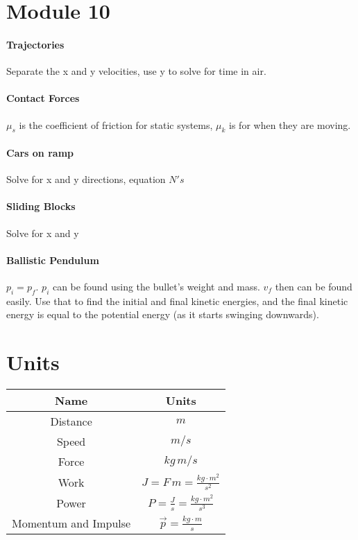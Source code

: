 \documentclass[10pt,letter]{article}
\begin{document}
\pagebreak
\section*{Module 10}
\paragraph{Trajectories} Separate the x and y velocities, use y to solve for time in air. 
\paragraph{Contact Forces} $\mu_s$ is the coefficient of friction for static systems, $\mu_k$ is for when they are moving. 
\paragraph{Cars on ramp} Solve for x and y directions, equation $N's$ 
\paragraph{Sliding Blocks} Solve for x and y 
\paragraph{Ballistic Pendulum} $p_i=p_f$. $p_i$ can be found using the bullet's weight and mass. $v_f$ then can be found easily. Use that to find the initial and final kinetic energies, and the final kinetic energy is equal to the potential energy (as it starts swinging downwards). 





\pagebreak 

\section*{Units}
\begin{center}
\begin{tabular}{c|c}
 Name & Units\\
 \hline
 Distance & $m$ \\ 
 Speed & $m/s$ \\ 
 Force & $kg\,m/s$ \\
 Work & $J=F\,m=\frac{kg\cdot m^2}{s^2}$ \\ 
 Power & $P=\frac{J}{s}=\frac{kg\cdot m^2}{s^3}$ \\ 
 Momentum and Impulse & $\vec{p}=\frac{kg\cdot m}{s}$ \\ 
 
\end{tabular}
\end{center}
\end{document}
